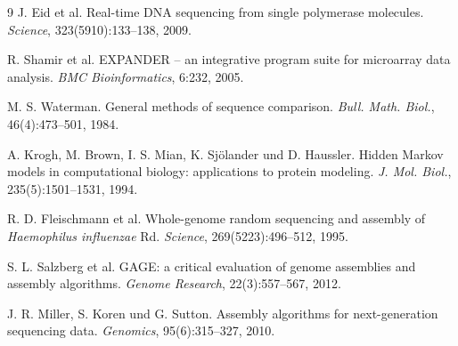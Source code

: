 ﻿\documentclass[a4paper,12pt]{article}
\theoremstyle{definition}
\begin{document}
\begin{thebibliography}{9}
    J. Eid et al.
    Real-time DNA sequencing from single polymerase molecules.
    \textit{Science}, 323(5910):133--138, 2009.

    R. Shamir et al.
    EXPANDER -- an integrative program suite for microarray data analysis.
    \textit{BMC Bioinformatics}, 6:232, 2005.

    M. S. Waterman.
    General methods of sequence comparison.
    \textit{Bull. Math. Biol.}, 46(4):473--501, 1984.

    A. Krogh, M. Brown, I. S. Mian, K. Sjölander und D. Haussler.
    Hidden Markov models in computational biology: applications to protein modeling.
    \textit{J. Mol. Biol.}, 235(5):1501--1531, 1994.

    R. D. Fleischmann et al.
    Whole-genome random sequencing and assembly of \textit{Haemophilus influenzae} Rd.
    \textit{Science}, 269(5223):496--512, 1995.

    S. L. Salzberg et al.
    GAGE: a critical evaluation of genome assemblies and assembly algorithms.
    \textit{Genome Research}, 22(3):557--567, 2012.

    J. R. Miller, S. Koren und G. Sutton.
    Assembly algorithms for next-generation sequencing data.
    \textit{Genomics}, 95(6):315--327, 2010.

\end{thebibliography}
\end{document}
